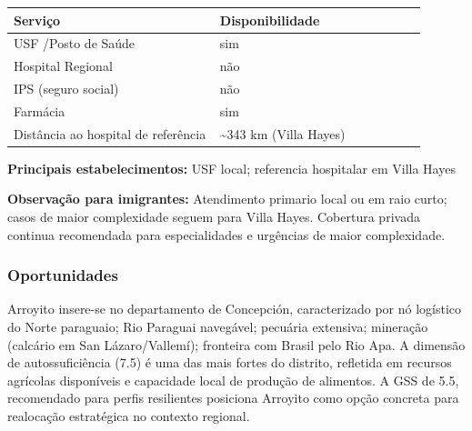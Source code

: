 {\def\LTcaptype{none} %
\begin{longtable}{@{}>{\raggedright\arraybackslash}p{0.45\linewidth} >{\raggedright\arraybackslash}p{0.45\linewidth}@{}}
\toprule\noalign{}
Serviço & Disponibilidade \\
\midrule\noalign{}
\endhead
\bottomrule\noalign{}
\endlastfoot
USF /\allowbreak \allowbreak  Posto de Saúde & sim \\
Hospital Regional & não \\
IPS (seguro social) & não \\
Farmácia & sim \\
Distância ao hospital de referência & \textasciitilde343 km (Villa
Hayes) \\
\end{longtable}
}

\textbf{Principais estabelecimentos:} USF local; referencia hospitalar
em Villa Hayes

\textbf{Observação para imigrantes:} Atendimento primario local ou em
raio curto; casos de maior complexidade seguem para Villa Hayes.
Cobertura privada continua recomendada para especialidades e urgências
de maior complexidade.
\newpage

\subsubsection*{Oportunidades}\label{oport-arroyito-0112}
Arroyito insere-se no departamento de Concepción, caracterizado por nó logístico do Norte paraguaio; Rio Paraguai navegável; pecuária extensiva; mineração (calcário em San Lázaro/Vallemí); fronteira com Brasil pelo Rio Apa. A dimensão de autossuficiência (7.5) é uma das mais fortes do distrito, refletida em recursos agrícolas disponíveis e capacidade local de produção de alimentos. A GSS de 5.5, recomendado para perfis resilientes posiciona Arroyito como opção concreta para realocação estratégica no contexto regional.

